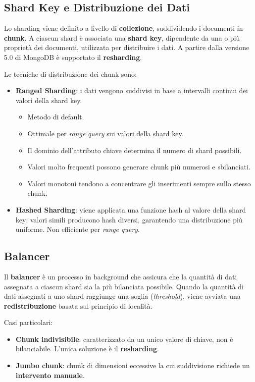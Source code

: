 \subsection*{Shard Key e Distribuzione dei Dati}

Lo sharding viene definito a livello di \textbf{collezione}, suddividendo i documenti in \textbf{chunk}. A ciascun shard è associata una \textbf{shard key}, dipendente da una o più proprietà dei documenti, utilizzata per distribuire i dati. A partire dalla versione 5.0 di MongoDB è supportato il \textbf{resharding}.

Le tecniche di distribuzione dei chunk sono:

\begin{itemize}
	\item \textbf{Ranged Sharding}: i dati vengono suddivisi in base a intervalli continui dei valori della shard key.
	\begin{itemize}
		\item Metodo di default.
		\item Ottimale per \textit{range query} sui valori della shard key.
		\item Il dominio dell'attributo chiave determina il numero di shard possibili.
		\item Valori molto frequenti possono generare chunk più numerosi e sbilanciati.
		\item Valori monotoni tendono a concentrare gli inserimenti sempre sullo stesso chunk.
	\end{itemize}
	\item \textbf{Hashed Sharding}: viene applicata una funzione hash al valore della shard key: valori simili producono hash diversi, garantendo una distribuzione più uniforme. Non efficiente per \textit{range query}.
\end{itemize}
\subsection*{Balancer}

Il \textbf{balancer} è un processo in background che assicura che la quantità di dati assegnata a ciascun shard sia la più bilanciata possibile. Quando la quantità di dati assegnati a uno shard raggiunge una soglia (\textit{threshold}), viene avviata una \textbf{redistribuzione} basata sul principio di località.

Casi particolari:

\begin{itemize}
	\item \textbf{Chunk indivisibile}: caratterizzato da un unico valore di chiave, non è bilanciabile. L'unica soluzione è il \textbf{resharding}.
	\item \textbf{Jumbo chunk}: chunk di dimensioni eccessive la cui suddivisione richiede un \textbf{intervento manuale}.
\end{itemize}

